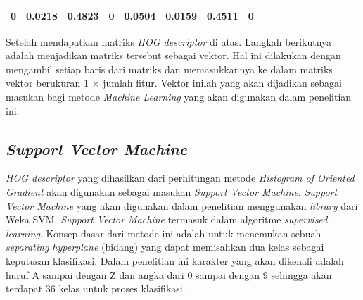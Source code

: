 \begin{enumerate}
\begin{table}[H]
\begin{small}
\begin{tabular}{|p{1cm}|p{1cm}|p{1cm}|p{1cm}|p{1cm}|p{1cm}|p{1cm}|p{1cm}|}
			\hline
			0 & 0.0218 & 0.4823 & 0 & 0.0504 & 0.0159 & 0.4511 & 0 \\
			\hline
		\end{tabular}
	\end{small}
	\label{fig:MatriksHasilNormalisasi}
\end{table}
Setelah mendapatkan matriks \textit{HOG descriptor} di atas. Langkah berikutnya adalah menjadikan matriks tersebut sebagai vektor. Hal ini dilakukan dengan mengambil setiap baris dari matriks dan memasukkannya ke dalam matriks vektor berukuran 1 $\times$ jumlah fitur. Vektor inilah yang akan dijadikan sebagai masukan bagi metode \textit{Machine Learning} yang akan digunakan dalam penelitian ini.\\
\end{enumerate}

\subsection{\textit{Support Vector Machine}}
\noindent \textit{HOG descriptor} yang dihasilkan dari perhitungan metode \textit{Histogram of Oriented Gradient} akan digunakan sebagai masukan \textit{Support Vector Machine}. \textit{Support Vector Machine} yang akan digunakan dalam penelitian menggunakan \textit{library} dari Weka SVM. \textit{Support Vector Machine} termasuk dalam algoritme \textit{supervised learning}. Konsep dasar dari metode ini adalah untuk menemukan sebuah \textit{separating hyperplane} (bidang) yang dapat memisahkan dua kelas sebagai keputusan klasifikasi. Dalam penelitian ini karakter yang akan dikenali adalah huruf A sampai dengan Z dan angka dari 0 sampai dengan 9 sehingga akan terdapat 36 kelas untuk proses klasifikasi.



\newpage